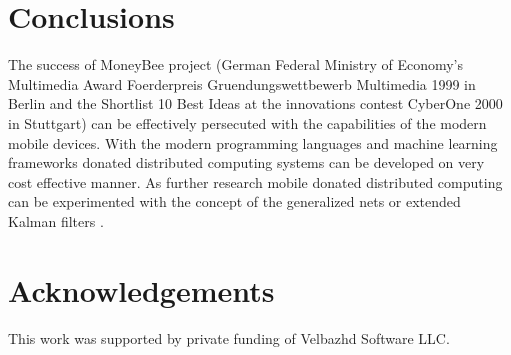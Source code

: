 \documentclass{llncs}
\begin{document}
\section{Conclusions} \label{Conclusions}

The success of MoneyBee project (German Federal Ministry of Economy's Multimedia Award Foerderpreis Gruendungswettbewerb Multimedia 1999 in Berlin and the Shortlist 10 Best Ideas at the innovations contest CyberOne 2000 in Stuttgart) can be effectively persecuted with the capabilities of the modern mobile devices. With the modern programming languages and machine learning frameworks donated distributed computing systems can be developed on very cost effective manner. As further research mobile donated distributed computing can be experimented with the concept of the generalized nets \cite{tashev01,tashev02} or extended Kalman filters \cite{alexandrov01}.


\section*{Acknowledgements}

This work was supported by private funding of Velbazhd Software LLC.

\end{document}
